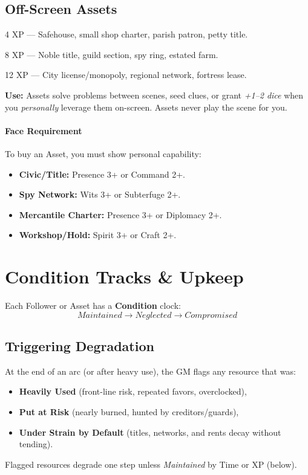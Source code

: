 \documentclass[12pt]{book}
\begin{document}
\subsection{Off-Screen Assets}
\begin{description}[leftmargin=3.2cm]
  \item[Minor] 4 XP — Safehouse, small shop charter, parish patron, petty title.
  \item[Standard] 8 XP — Noble title, guild section, spy ring, estated farm.
  \item[Major] 12 XP — City license/monopoly, regional network, fortress lease.
\end{description}
\textbf{Use:} Assets solve problems between scenes, seed clues, or grant \emph{+1--2 dice} when you \emph{personally} leverage them on-screen. Assets never play the scene for you.

\paragraph{Face Requirement}
To buy an Asset, you must show personal capability:
\begin{itemize}
  \item \textbf{Civic/Title:} Presence 3+ or Command 2+.
  \item \textbf{Spy Network:} Wits 3+ or Subterfuge 2+.
  \item \textbf{Mercantile Charter:} Presence 3+ or Diplomacy 2+.
  \item \textbf{Workshop/Hold:} Spirit 3+ or Craft 2+.
\end{itemize}

\section{Condition Tracks \& Upkeep}
\label{upkeep}
Each Follower or Asset has a \textbf{Condition} clock:
\[
\textit{Maintained} \rightarrow \textit{Neglected} \rightarrow \textit{Compromised}
\]

\subsection{Triggering Degradation}
At the end of an arc (or after heavy use), the GM flags any resource that was:
\begin{itemize}
  \item \textbf{Heavily Used} (front-line risk, repeated favors, overclocked),
  \item \textbf{Put at Risk} (nearly burned, hunted by creditors/guards),
  \item \textbf{Under Strain by Default} (titles, networks, and rents decay without tending).
\end{itemize}
Flagged resources degrade one step unless \emph{Maintained} by Time or XP (below).
\end{document}
